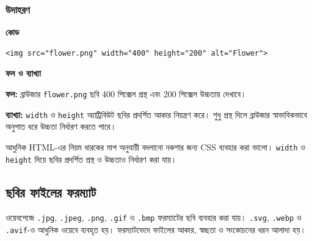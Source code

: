 \subsubsection{উদাহরণ}

\par\noindent
\begin{minipage}[t]{.54\linewidth}\vspace{0pt}\small
\textbf{\color{chFourTeal}কোড}\par
\begin{verbatim}
<img src="flower.png" width="400" height="200" alt="Flower">
\end{verbatim}

\par\smallskip
\end{minipage}\hfill
\begin{minipage}[t]{.42\linewidth}\vspace{0pt}\small
\textbf{\color{chFourTeal}ফল ও ব্যাখ্যা}\par
\textbf{ফল:} ব্রাউজার \texttt{flower.png} ছবি 400 পিক্সেল প্রস্থ এবং 200 পিক্সেল উচ্চতায় দেখাবে।

\textbf{ব্যাখ্যা:} \texttt{width} ও \texttt{height} অ্যাট্রিবিউট ছবির প্রদর্শিত আকার নিয়ন্ত্রণ করে। শুধু প্রস্থ দিলে ব্রাউজার স্বাভাবিকভাবে অনুপাত ধরে উচ্চতা নির্ধারণ করতে পারে।
\par\smallskip
\end{minipage}\par


\begin{keypointbox}{আধুনিক HTML-এর নিয়ম}
ধারকের মাপ অনুযায়ী বদলানো নকশার জন্য CSS ব্যবহার করা ভালো। \texttt{width} ও \texttt{height} দিয়ে ছবির প্রদর্শিত প্রস্থ ও উচ্চতাও নির্ধারণ করা যায়।
\end{keypointbox}

\subsection{ছবির ফাইলের ফরম্যাট}

ওয়েবপেজে \texttt{.jpg}, \texttt{.jpeg}, \texttt{.png}, \texttt{.gif} ও \texttt{.bmp} ফরম্যাটের ছবি ব্যবহার করা যায়। \texttt{.svg}, \texttt{.webp} ও \texttt{.avif}-ও আধুনিক ওয়েবে ব্যবহৃত হয়। ফরম্যাটভেদে ফাইলের আকার, স্বচ্ছতা ও সংকোচনের ধরন আলাদা হয়।


